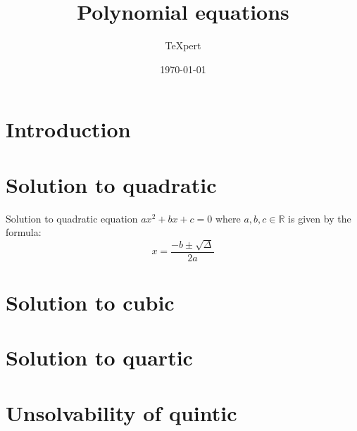\documentclass{article}
\title{Polynomial equations}
\author{TeXpert}
\date{\today}
\begin{document}
\maketitle

\section{Introduction}

\section{Solution to quadratic}

Solution to quadratic equation $ax^2 + bx + c = 0$ where $a, b, c \in \mathbb{R}$ is given by the formula:
$$x = \frac{-b\pm\sqrt{\Delta}}{2a}$$

\section{Solution to cubic}

\section{Solution to quartic}

\section{Unsolvability of quintic}
\end{document}
